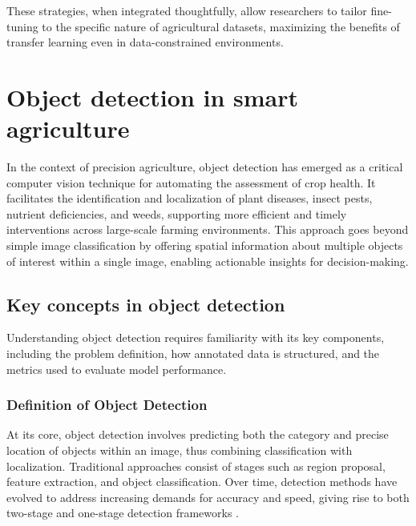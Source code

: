 These strategies, when integrated thoughtfully, allow researchers to tailor fine-tuning to the specific nature of agricultural datasets, maximizing the benefits of transfer learning even in data-constrained environments.


\section{Object detection in smart agriculture}
In the context of precision agriculture, object detection has emerged as a critical computer vision technique for automating the assessment of crop health. It facilitates the identification and localization of plant diseases, insect pests, nutrient deficiencies, and weeds, supporting more efficient and timely interventions across large-scale farming environments. 
This approach goes beyond simple image classification by offering spatial information about multiple objects of interest within a single image, enabling actionable insights for decision-making.

\subsection{Key concepts in object detection}
Understanding object detection requires familiarity with its key components, including the problem definition, how annotated data is structured, and the metrics used to evaluate model performance. 
\subsubsection{Definition of Object Detection}
At its core, object detection involves predicting both the category and precise location of objects within an image, thus combining classification with localization. Traditional approaches consist of stages such as region proposal, feature extraction, and object classification. Over time, detection methods have evolved to address increasing demands for accuracy and speed, giving rise to both two-stage and one-stage detection frameworks \parencite{zhao2019objectdetection}.

